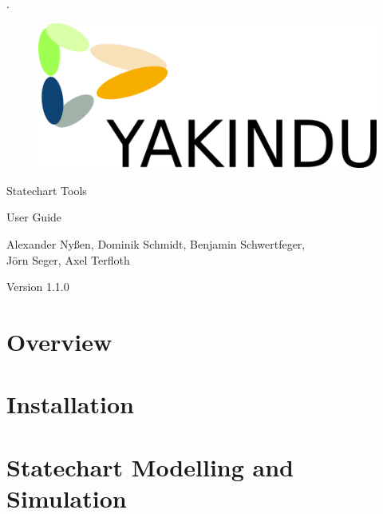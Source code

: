 \documentclass[12pt,ngerman, a4paper]{book}
\begin{document}
\setlength\headheight{0.6in}

.
\vspace{2cm}

\begin{center}
\begin{figure}[h!]
\centering
\includegraphics{Pictures/yakinduLogoBig}
\end{figure}

\vspace{2cm}

\Huge{Statechart Tools}

\Huge{User Guide}

\vspace{1cm}

\large{Alexander Nyßen, Dominik Schmidt, Benjamin Schwertfeger, \\J\"orn Seger,
Axel Terfloth}

Version 1.1.0
\end{center}


\tableofcontents

\clearpage
\chapter{Overview}

%

\chapter{Installation}


\chapter{Statechart Modelling and Simulation}

\end{document}
